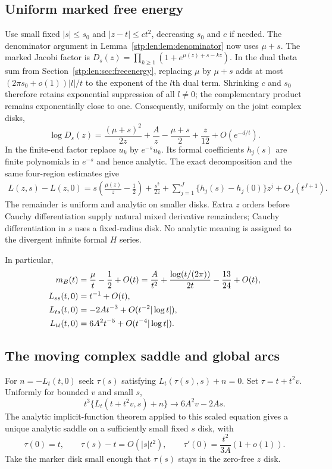 \documentclass[11pt]{article}
\theoremstyle{remark}\newtheorem{remark}[theorem]{Remark}
\begin{document}
\subsection{Uniform marked free energy}
Use small fixed $|s|\le s_0$ and $|z-t|\le ct^2$, decreasing $s_0$ and $c$ if needed. The denominator argument in Lemma~\ref{stp:len:lem:denominator} now uses $\mu+s$. The marked Jacobi factor is $D_s(z)=\prod_{k\ge1}(1+e^{\mu(z)+s-kz})$. In the dual theta sum from Section~\ref{stp:len:sec:freeenergy}, replacing $\mu$ by $\mu+s$ adds at most $(2\pi s_0+o(1))|l|/t$ to the exponent of the $l$th dual term. Shrinking $c$ and $s_0$ therefore retains exponential suppression of all $l\ne0$; the complementary product remains exponentially close to one. Consequently, uniformly on the joint complex disks,
\[
 \log D_s(z)=\frac{(\mu+s)^2}{2z}+\frac A z-\frac{\mu+s}{2}
               +\frac z{12}+O(e^{-d/t}).
\]
In the finite-end factor replace $u_k$ by $e^{-s}u_k$. Its formal coefficients $h_j(s)$ are finite polynomials in $e^{-s}$ and hence analytic. The exact decomposition and the same four-region estimates give
\begin{equation}\label{stp:len:eq:markedL}
\begin{split}
 L(z,s)-L(z,0)
 =s\left(\frac{\mu(z)}z-\frac12\right)+\frac{s^2}{2z}
 +\sum_{j=1}^J\{h_j(s)-h_j(0)\}z^j+O_J(t^{J+1}).
\end{split}
\end{equation}
The remainder is uniform and analytic on smaller disks. Extra $z$ orders before Cauchy differentiation supply natural mixed derivative remainders; Cauchy differentiation in $s$ uses a fixed-radius disk. No analytic meaning is assigned to the divergent infinite formal $H$ series.

In particular,
\begin{align}
 m_B(t)&=\frac\mu t-\frac12+O(t)
 =\frac A{t^2}+\frac{\log(t/(2\pi))}{2t}-\frac{13}{24}+O(t),\label{stp:len:eq:mBexp}\\
 L_{ss}(t,0)&=t^{-1}+O(t),\notag\\
 L_{ts}(t,0)&=-2At^{-3}+O(t^{-2}|\log t|),\label{stp:len:eq:markedderivatives}\\
 L_{tt}(t,0)&=6A^2t^{-5}+O(t^{-4}|\log t|).\notag
\end{align}

\subsection{The moving complex saddle and global arcs}
For $n=-L_t(t,0)$ seek $\tau(s)$ satisfying $L_t(\tau(s),s)+n=0$. Set $\tau=t+t^2v$. Uniformly for bounded $v$ and small $s$,
\[
 t^3\{L_t(t+t^2v,s)+n\}\longrightarrow6A^2v-2As.
\]
The analytic implicit-function theorem applied to this scaled equation gives a unique analytic saddle on a sufficiently small fixed $s$ disk, with
\begin{equation}\label{stp:len:eq:taus}
 \tau(0)=t,\qquad \tau(s)-t=O(|s|t^2),\qquad
 \tau'(0)=\frac{t^2}{3A}(1+o(1)).
\end{equation}
Take the marker disk small enough that $\tau(s)$ stays in the zero-free $z$ disk.
\end{document}
